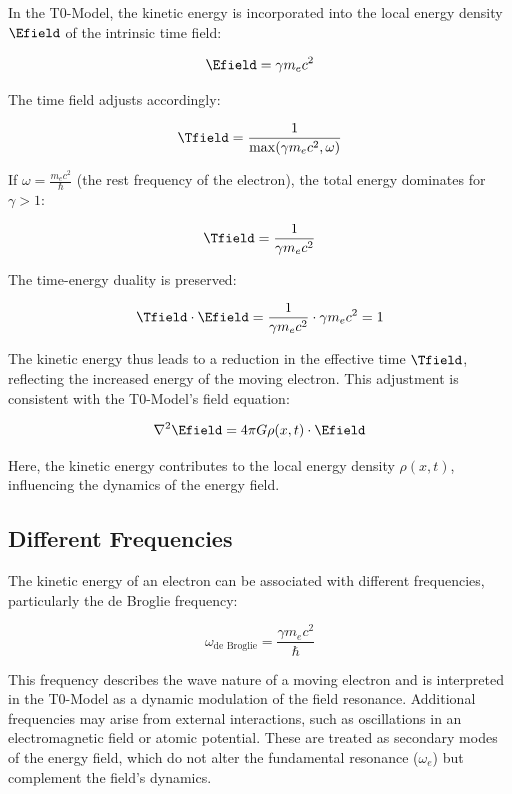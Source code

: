 In the T0-Model, the kinetic energy is incorporated into the local energy density \( \Efield \) of the intrinsic time field:

\begin{equation}
	\Efield = \gamma m_e c^2
\end{equation}

The time field adjusts accordingly:

\begin{equation}
	\Tfield = \frac{1}{\max(\gamma m_e c^2, \omega)}
\end{equation}

If \(\omega = \frac{m_e c^2}{\hbar}\) (the rest frequency of the electron), the total energy dominates for \(\gamma > 1\):

\begin{equation}
	\Tfield = \frac{1}{\gamma m_e c^2}
\end{equation}

The time-energy duality is preserved:

\begin{equation}
	\Tfield \cdot \Efield = \frac{1}{\gamma m_e c^2} \cdot \gamma m_e c^2 = 1
\end{equation}

The kinetic energy thus leads to a reduction in the effective time \( \Tfield \), reflecting the increased energy of the moving electron. This adjustment is consistent with the T0-Model's field equation:

\begin{equation}
	\nabla^2 \Efield = 4\pi G \rho(x,t) \cdot \Efield
	\label{eq:energy_field_equation}
\end{equation}

Here, the kinetic energy contributes to the local energy density \(\rho(x,t)\), influencing the dynamics of the energy field.

\subsection{Different Frequencies}
\label{subsec:electron_frequencies}

The kinetic energy of an electron can be associated with different frequencies, particularly the de Broglie frequency:

\begin{equation}
	\omega_{\text{de Broglie}} = \frac{\gamma m_e c^2}{\hbar}
\end{equation}

This frequency describes the wave nature of a moving electron and is interpreted in the T0-Model as a dynamic modulation of the field resonance. Additional frequencies may arise from external interactions, such as oscillations in an electromagnetic field or atomic potential. These are treated as secondary modes of the energy field, which do not alter the fundamental resonance (\(\omega_e\)) but complement the field's dynamics.


